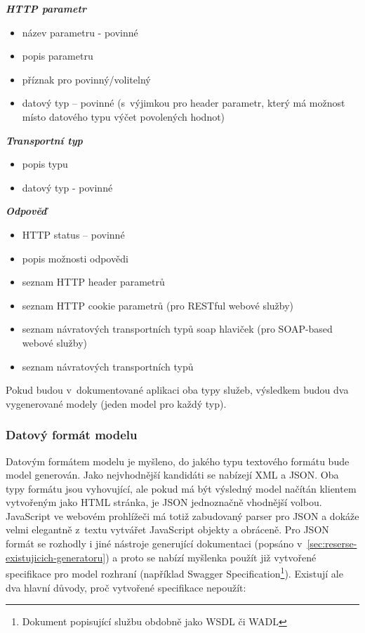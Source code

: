 \documentclass[11pt,twoside,a4paper]{book}
\begin{document}
\textbf{\textit{HTTP parametr}}

\begin{itemize}
  \item název parametru - povinné
  \item popis parametru
  \item příznak pro povinný/volitelný
  \item datový typ – povinné (s~výjimkou pro header parametr, který má možnost
  místo datového typu výčet povolených hodnot)
\end{itemize}

\textbf{\textit{Transportní typ}}

\begin{itemize}
  \item popis typu
  \item datový typ - povinné
\end{itemize}

\textbf{\textit{Odpověď}}

\begin{itemize}
  \item HTTP status – povinné
  \item popis možnosti odpovědi
  \item seznam HTTP header parametrů
  \item seznam HTTP cookie parametrů (pro RESTful webové služby)
  \item seznam návratových transportních typů soap hlaviček (pro SOAP-based webové služby)
  \item seznam návratových transportních typů
\end{itemize}

Pokud budou v~dokumentované aplikaci oba typy služeb, výsledkem budou dva
vygenerované modely (jeden model pro každý typ).

\subsubsection{Datový formát modelu}

Datovým formátem modelu je myšleno, do jakého typu textového formátu bude model
generován. Jako nejvhodnější kandidáti se nabízejí XML a JSON. Oba typy formátu
jsou vyhovující, ale pokud má být výsledný model načítán klientem vytvořeným
jako HTML stránka, je JSON jednoznačně vhodnější volbou. JavaScript ve webovém
prohlížeči má totiž zabudovaný parser pro JSON a dokáže velmi elegantně z~textu
vytvářet JavaScript objekty a obráceně. Pro JSON formát se rozhodly i jiné
nástroje generující dokumentaci (popsáno
v~\ref{sec:reserse-existujicich-generatoru}) a proto se nabízí myšlenka použít již
vytvořené specifikace pro model rozhraní (například Swagger
Specification\footnote{Dokument popisující službu obdobně jako WSDL či WADL}).
Existují ale dva hlavní důvody, proč vytvořené specifikace nepoužít:
\end{document}
